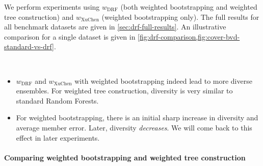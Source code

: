 \documentclass[../main.tex]{subfiles}
\begin{document}
We perform experiments using $w_\text{DRF}$ (both weighted bootstrapping and weighted tree construction) and $w_\text{XuChen}$ (weighted bootstrapping only). The full results for all benchmark datasets are given in \cref{sec:drf-full-results}. An illustrative comparison for a single dataset is given in \cref{fig:drf-comparison,fig:cover-bvd-standard-vs-drf}.

\begin{observation} ~~
    \label{obs:drf}
    \begin{itemize}
        \item $w_\text{DRF}$ and $w_\text{XuChen}$ with weighted bootstrapping indeed lead to more diverse ensembles. For weighted tree construction, diversity is very similar to standard Random Forests.
        \item For weighted bootstrapping, there is an initial sharp increase in diversity and average member error. Later, diversity \textit{decreases}. We will come back to this effect in later experiments.
    \end{itemize}
\end{observation}




\paragraph{Comparing weighted bootstrapping and weighted tree construction} 
\end{document}

